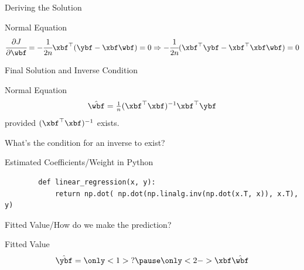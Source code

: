 \documentclass[aspectratio=169,xcolor=dvipsnames,svgnames,x11names,fleqn]{beamer}
\begin{document}
    \begin{frame}{Deriving the Solution}
    \begin{facts}{Normal Equation}
    {
    \Large
    \begin{equation}
        \cfrac{\partial J}{\partial \wbf} = -\cfrac{1}{2n}\xbf^\top(\ybf - \xbf \wbf) = 0 \Rightarrow  -\cfrac{1}{2n}(\xbf^\top\ybf - \xbf^\top\xbf \wbf) = 0
    \end{equation}
    }
    \end{facts}
    \end{frame}
    
    \begin{frame}{Final Solution and Inverse Condition}
    \begin{facts}{Normal Equation}
    {
    \Large
    $$\hat{\wbf} =\tfrac{1}{n}(\xbf^\top\xbf)^{-1}\xbf^\top \ybf $$
    provided $(\xbf^\top\xbf)^{-1}$ exists. 
    }
    \end{facts}
    What's the condition for an inverse to exist?
    \end{frame}

\begin{frame}[containsverbatim]{Estimated Coefficients/Weight in Python}
    \begin{verbatim}
        def linear_regression(x, y):
            return np.dot( np.dot(np.linalg.inv(np.dot(x.T, x)), x.T), y)
    \end{verbatim}
    \end{frame}

\begin{frame}{Fitted Value/How do we make the prediction?}

    \begin{facts}{Fitted Value}
    {
    \LARGE
    \begin{equation}
        \hat{\ybf} =\only<1>{?} \pause \only<2->{\xbf \hat{\wbf}}
    \end{equation}
    }
    \end{facts}
    
    \end{frame}
\end{document}
